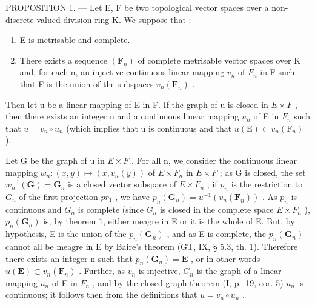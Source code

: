 PROPOSITION 1. --- Let E, F be two topological vector spaces over a non-discrete valued division ring K. We suppose that :

\begin{enumerate}
\def\labelenumi{\arabic{enumi})}
\item
  E is metrisable and complete.
\item
  There exists a sequence \((\mathbf{F}_{n})\) of complete metrisable vector spaces over K and, for each n, an injective continuous linear mapping \(v_{n}\) of \(F_{n}\) in F such that F is the union of the subspaces \(v_{n}(\mathbf{F}_{n})\) .
\end{enumerate}

Then let u be a linear mapping of E in F. If the graph of u is closed in \(E \times F\) , then there exists an integer n and a continuous linear mapping \(u_{n}\) of E in \(F_{n}\) such that \(u = v_{n} \circ u_{n}\) (which implies that u is continuous and that \(u(\mathrm{E}) \subset v_{n}(\mathrm{F}_{n})\) ).

Let G be the graph of u in \(E \times F\) . For all n, we consider the continuous linear mapping \(w_{n}:(x,y)\mapsto(x,v_{n}(y))\) of \(E \times F_{n}\) in \(E \times F\) ; as G is closed, the set \(w_{n}^{-1}(\mathbf{G})=\mathbf{G}_{n}\) is a closed vector subspace of \(E \times F_{n}\) ; if \(p_{n}\) is the restriction to \(G_{n}\) of the first projection \(pr_{1}\) , we have \(p_{n}(\mathbf{G}_{n})=u^{-1}(v_{n}(\mathbf{F}_{n}))\) . As \(p_{n}\) is continuous and \(G_{n}\) is complete (since \(G_{n}\) is closed in the complete space \(E \times F_{n}\) ), \(p_{n}(\mathbf{G}_{n})\) is, by theorem 1, either meagre in E or it is the whole of E. But, by hypothesis, E is the union of the \(p_{n}(\mathbf{G}_{n})\) , and as E is complete, the \(p_{n}(\mathbf{G}_{n})\) cannot all be meagre in E by Baire's theorem (GT, IX, § 5.3, th. 1). Therefore there exists an integer n such that \(p_{n}(\mathbf{G}_{n}) = \mathbf{E}\) , or in other words \(u(\mathbf{E}) \subset v_{n}(\mathbf{F}_{n})\) . Further, as \(v_{n}\) is injective, \(G_{n}\) is the graph of a linear mapping \(u_{n}\) of E in \(F_{n}\) , and by the closed graph theorem (I, p.~19, cor. 5) \(u_{n}\) is continuous; it follows then from the definitions that \(u = v_{n} \circ u_{n}\) .

\exercisesheading

\exercisegroup

